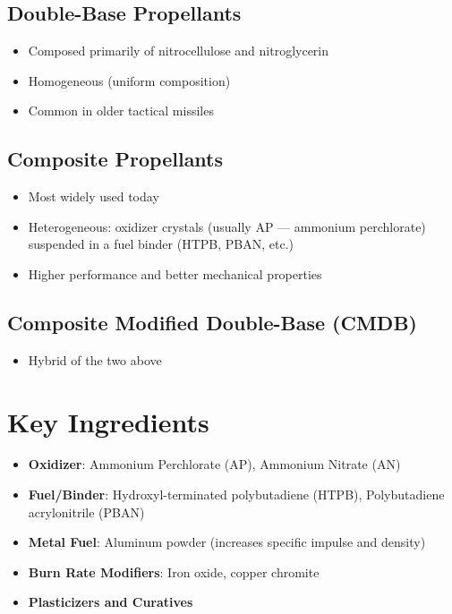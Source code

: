 \documentclass[
  letterpaper,
  DIV=11,
  numbers=noendperiod]{scrreprt}
\providecommand{\tightlist}{%
  \setlength{\itemsep}{0pt}\setlength{\parskip}{0pt}}
\begin{document}
\subsection{Double-Base Propellants}\label{double-base-propellants}

\begin{itemize}
\tightlist
\item
  Composed primarily of nitrocellulose and nitroglycerin
\item
  Homogeneous (uniform composition)
\item
  Common in older tactical missiles
\end{itemize}

\subsection{Composite Propellants}\label{composite-propellants}

\begin{itemize}
\tightlist
\item
  Most widely used today
\item
  Heterogeneous: oxidizer crystals (usually AP --- ammonium perchlorate)
  suspended in a fuel binder (HTPB, PBAN, etc.)
\item
  Higher performance and better mechanical properties
\end{itemize}

\subsection{Composite Modified Double-Base
(CMDB)}\label{composite-modified-double-base-cmdb}

\begin{itemize}
\tightlist
\item
  Hybrid of the two above
\end{itemize}

\section{Key Ingredients}\label{key-ingredients}

\begin{itemize}
\tightlist
\item
  \textbf{Oxidizer}: Ammonium Perchlorate (AP), Ammonium Nitrate (AN)
\item
  \textbf{Fuel/Binder}: Hydroxyl-terminated polybutadiene (HTPB),
  Polybutadiene acrylonitrile (PBAN)
\item
  \textbf{Metal Fuel}: Aluminum powder (increases specific impulse and
  density)
\item
  \textbf{Burn Rate Modifiers}: Iron oxide, copper chromite
\item
  \textbf{Plasticizers and Curatives}
\end{itemize}
\end{document}
